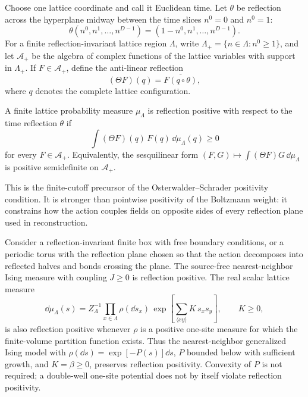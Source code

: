 Choose one lattice coordinate and call it Euclidean time.  Let
\(\theta\) be reflection across the hyperplane midway between the time slices
\(n^0=0\) and \(n^0=1\):
\[
  \theta(n^0,n^1,\ldots,n^{D-1})
  =
  (1-n^0,n^1,\ldots,n^{D-1}) .
\]
For a finite reflection-invariant lattice region \(\Lambda\), write
\(\Lambda_+=\{n\in\Lambda:n^0\geq1\}\), and let
\(\mathcal A_+\) be the algebra of complex functions of the lattice variables
with support in \(\Lambda_+\).  If \(F\in\mathcal A_+\), define the
anti-linear reflection
\[
  (\Theta F)(q)=\overline{F(q\circ\theta)} ,
\]
where \(q\) denotes the complete lattice configuration.

\begin{definition}
A finite lattice probability measure \(\mu_\Lambda\) is reflection positive
with respect to the time reflection \(\theta\) if
\begin{equation}
  \int (\Theta F)(q)\,F(q)\,\dd\mu_\Lambda(q)\geq0
  \label{eq:finite-lattice-reflection-positivity}
\end{equation}
for every \(F\in\mathcal A_+\).  Equivalently, the sesquilinear form
\((F,G)\mapsto\int(\Theta F)G\,\dd\mu_\Lambda\) is positive semidefinite on
\(\mathcal A_+\).
\end{definition}

This is the finite-cutoff precursor of the Osterwalder--Schrader positivity
condition.  It is stronger than pointwise positivity of the Boltzmann weight:
it constrains how the action couples fields on opposite sides of every
reflection plane used in reconstruction.

\begin{proposition}
\label{prop:ferromagnetic-nearest-neighbor-reflection-positive}
Consider a reflection-invariant finite box with free boundary conditions, or a
periodic torus with the reflection plane chosen so that the action decomposes
into reflected halves and bonds crossing the plane.  The source-free
nearest-neighbor Ising measure with coupling \(J\geq0\) is reflection
positive.  The real scalar lattice measure
\begin{equation}
  \dd\mu_\Lambda(s)
  =
  Z_\Lambda^{-1}
  \prod_{x\in\Lambda}\rho(\dd s_x)\,
  \exp\!\left[
    \sum_{\langle x y\rangle}K\,s_xs_y
  \right],
  \qquad K\geq0,
  \label{eq:scalar-ferromagnetic-rp-measure}
\end{equation}
is also reflection positive whenever \(\rho\) is a positive one-site measure
for which the finite-volume partition function exists.  Thus the
nearest-neighbor generalized Ising model with
\(\rho(\dd s)=\exp[-P(s)]\dd s\), \(P\) bounded below with sufficient growth,
and \(K=\beta\geq0\), preserves reflection positivity.  Convexity of \(P\) is
not required; a double-well one-site potential does not by itself violate
reflection positivity.
\end{proposition}


